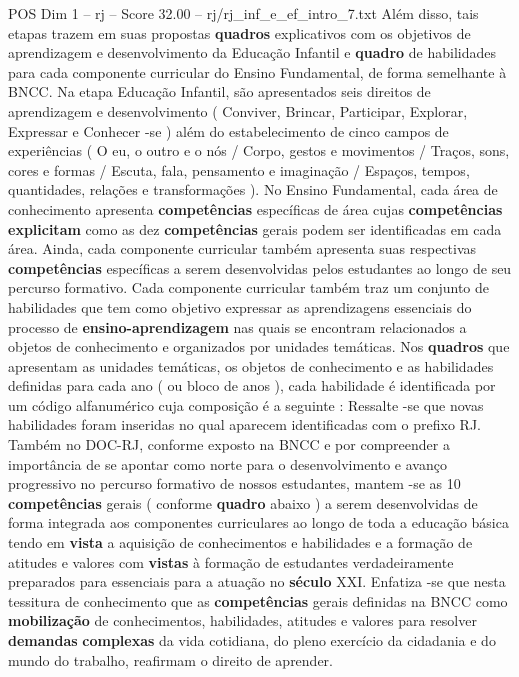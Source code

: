 \begin{textsample}{POS Dim 1 – rj – Score 32.00 – rj/rj\_inf\_e\_ef\_intro\_7.txt}
Além disso, tais etapas trazem em suas propostas \textbf{quadros} explicativos com os objetivos de aprendizagem e desenvolvimento da Educação Infantil e \textbf{quadro} de habilidades para cada componente curricular do Ensino Fundamental, de forma semelhante à BNCC.
Na etapa Educação Infantil, são apresentados seis direitos de aprendizagem e desenvolvimento ( Conviver, Brincar, Participar, Explorar, Expressar e Conhecer -se ) além do estabelecimento de cinco campos de experiências ( O eu, o outro e o nós / Corpo, gestos e movimentos / Traços, sons, cores e formas / Escuta, fala, pensamento e imaginação / Espaços, tempos, quantidades, relações e transformações ).
No Ensino Fundamental, cada área de conhecimento apresenta \textbf{competências} específicas de área cujas \textbf{competências} \textbf{explicitam} como as dez \textbf{competências} gerais podem ser identificadas em cada área.
Ainda, cada componente curricular também apresenta suas respectivas \textbf{competências} específicas a serem desenvolvidas pelos estudantes ao longo de seu percurso formativo.
Cada componente curricular também traz um conjunto de habilidades que tem como objetivo expressar as aprendizagens essenciais do processo de \textbf{ensino-aprendizagem} nas quais se encontram relacionados a objetos de conhecimento e organizados por unidades temáticas.
Nos \textbf{quadros} que apresentam as unidades temáticas, os objetos de conhecimento e as habilidades definidas para cada ano ( ou bloco de anos ), cada habilidade é identificada por um código alfanumérico cuja composição é a seguinte : Ressalte -se que novas habilidades foram inseridas no qual aparecem identificadas com o prefixo RJ.
Também no DOC-RJ, conforme exposto na BNCC e por compreender a importância de se apontar como norte para o desenvolvimento e avanço progressivo no percurso formativo de nossos estudantes, mantem -se as 10 \textbf{competências} gerais ( conforme \textbf{quadro} abaixo ) a serem desenvolvidas de forma integrada aos componentes curriculares ao longo de toda a educação básica tendo em \textbf{vista} a aquisição de conhecimentos e habilidades e a formação de atitudes e valores com \textbf{vistas} à formação de estudantes verdadeiramente preparados para essenciais para a atuação no \textbf{século} XXI.
Enfatiza -se que nesta tessitura de conhecimento que as \textbf{competências} gerais definidas na BNCC como \textbf{mobilização} de conhecimentos, habilidades, atitudes e valores para resolver \textbf{demandas} \textbf{complexas} da vida cotidiana, do pleno exercício da cidadania e do mundo do trabalho, reafirmam o direito de aprender.

\end{textsample}
